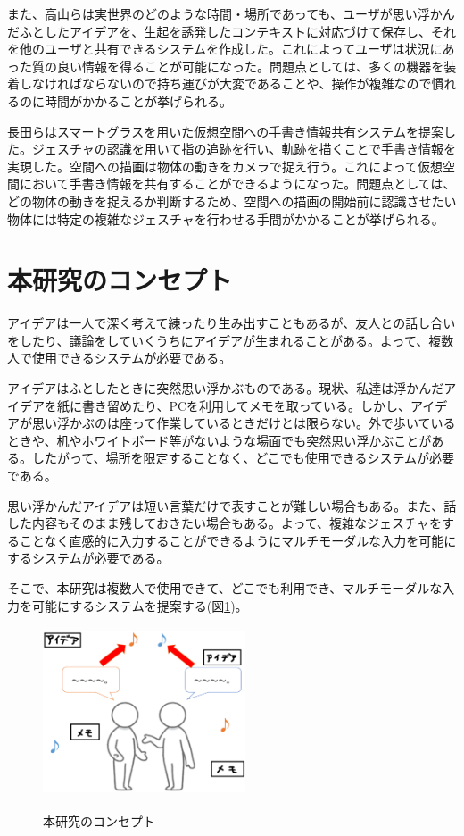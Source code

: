 \documentclass{hissymp}
\begin{document}
また、高山ら\cite{tex3,tex4}は実世界のどのような時間・場所であっても、ユーザが思い浮かんだふとしたアイデアを、生起を誘発したコンテキストに対応づけて保存し、それを他のユーザと共有できるシステムを作成した。これによってユーザは状況にあった質の良い情報を得ることが可能になった。問題点としては、多くの機器を装着しなければならないので持ち運びが大変であることや、操作が複雑なので慣れるのに時間がかかることが挙げられる。

長田ら\cite{tex5}はスマートグラスを用いた仮想空間への手書き情報共有システムを提案した。ジェスチャの認識を用いて指の追跡を行い、軌跡を描くことで手書き情報を実現した。空間への描画は物体の動きをカメラで捉え行う。これによって仮想空間において手書き情報を共有することができるようになった。問題点としては、どの物体の動きを捉えるか判断するため、空間への描画の開始前に認識させたい物体には特定の複雑なジェスチャを行わせる手間がかかることが挙げられる。

\section{本研究のコンセプト}
アイデアは一人で深く考えて練ったり生み出すこともあるが、友人との話し合いをしたり、議論をしていくうちにアイデアが生まれることがある。よって、複数人で使用できるシステムが必要である。

アイデアはふとしたときに突然思い浮かぶものである。現状、私達は浮かんだアイデアを紙に書き留めたり、PCを利用してメモを取っている。しかし、アイデアが思い浮かぶのは座って作業しているときだけとは限らない。外で歩いているときや、机やホワイトボード等がないような場面でも突然思い浮かぶことがある。したがって、場所を限定することなく、どこでも使用できるシステムが必要である。

思い浮かんだアイデアは短い言葉だけで表すことが難しい場合もある。また、話した内容もそのまま残しておきたい場合もある。よって、複雑なジェスチャをすることなく直感的に入力することができるようにマルチモーダルな入力を可能にするシステムが必要である。

そこで、本研究は複数人で使用できて、どこでも利用でき、マルチモーダルな入力を可能にするシステムを提案する(図\ref{fig:concept})。

\begin{figure}[h]
  \begin{center}
    \includegraphics[clip,height=5.0cm,width=6.0cm]{./concept.eps}
    \caption{本研究のコンセプト}
    \label{fig:concept}
  \end{center}
\end{figure}
\end{document}
